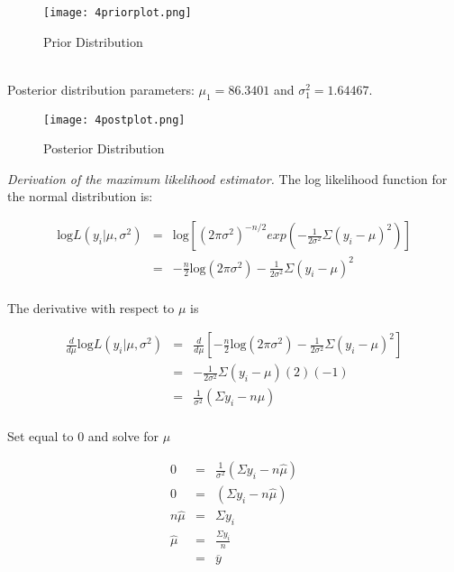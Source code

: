 \documentclass[12pt]{article}
\newcommand{\ybar}{\overline{y}}
\begin{document}
\begin{figure}[H]
\begin{center}
\texttt{[image: 4priorplot.png]}
\caption{Prior Distribution}
\end{center}
\end{figure}
\ \\ [-1.5cm]

\noindent Posterior distribution parameters: $\mu_1=86.3401$ and $\sigma_1^2=1.64467$. \\ [-.8cm]

\begin{figure}[H]
\begin{center}
\texttt{[image: 4postplot.png]}
\caption{Posterior Distribution}
\end{center}
\end{figure}

\noindent \textit{Derivation of the maximum likelihood estimator.}  The log likelihood function for the normal distribution is:

\begin{eqnarray*}
\mathrm{log}L(y_i|\mu,\sigma^2) &=& \mathrm{log}\left[(2\pi\sigma^2)^{-n/2}exp\left(-\frac{1}{2\sigma^2}\Sigma(y_i-\mu)^2\right)\right] \\
&=& -\frac{n}{2}\mathrm{log}(2\pi\sigma^2)-\frac{1}{2\sigma^2}\Sigma(y_i-\mu)^2 \\
\end{eqnarray*}

The derivative with respect to $\mu$ is

\begin{eqnarray*}
\frac{d}{d\mu}\mathrm{log}L(y_i|\mu,\sigma^2) &=& \frac{d}{d\mu}\left[-\frac{n}{2}\mathrm{log}(2\pi\sigma^2)-\frac{1}{2\sigma^2}\Sigma(y_i-\mu)^2\right] \\
&=& -\frac{1}{2\sigma^2}\Sigma(y_i-\mu)(2)(-1) \\
&=& \frac{1}{\sigma^2}(\Sigma y_i-n\mu) \\
\end{eqnarray*}

Set equal to 0 and solve for $\hat{\mu}$

\begin{eqnarray*}
0 &=& \frac{1}{\sigma^2}(\Sigma y_i-n\hat{\mu}) \\
0 &=& (\Sigma y_i-n\hat{\mu}) \\
n\hat{\mu} &=& \Sigma y_i \\
\hat{\mu} &=& \frac{\Sigma y_i}{n} \\
&=& \ybar \\
\end{eqnarray*}
\end{document}
